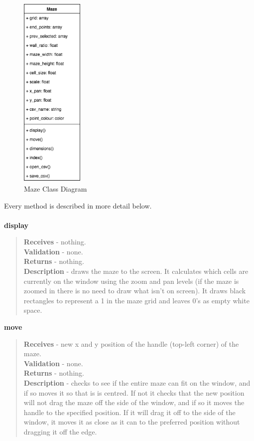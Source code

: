 \documentclass[titlepage]{article}
\begin{document}
\begin{figure}[H]
  \centering
  \includegraphics[width=3cm]{Mazecd.png}
  \caption{Maze Class Diagram}
  \label{fig:dijk}
\end{figure}

Every method is described in more detail below. \\\\

\textbf{display}
\begin{quote}
\textbf{Receives} - nothing. \\
\textbf{Validation} - none.\\
\textbf{Returns} - nothing. \\
\textbf{Description} - draws the maze to the screen. It calculates which cells are currently on the window using the zoom and pan levels (if the maze is zoomed in there is no need to draw what isn't on screen). It draws black rectangles to represent a 1 in the maze grid and leaves 0's as empty white space.
\end{quote}

\textbf{move}
\begin{quote}
\textbf{Receives} - new x and y position of the handle (top-left corner) of the maze. \\
\textbf{Validation} - none.\\
\textbf{Returns} - nothing. \\
\textbf{Description} - checks to see if the entire maze can fit on the window, and if so moves it so that is is centred. If not it checks that the new position will not drag the maze off the side of the window, and if so it moves the handle to the specified position. If it will drag it off to the side of the window, it moves it as close as it can to the preferred position without dragging it off the edge.
\end{quote}
\end{document}
